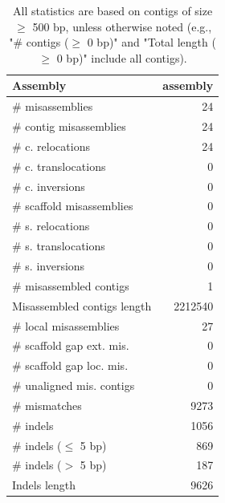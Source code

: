 \documentclass[12pt,a4paper]{article}
\begin{document}
\begin{table}[ht]
\begin{center}
\caption{All statistics are based on contigs of size $\geq$ 500 bp, unless otherwise noted (e.g., "\# contigs ($\geq$ 0 bp)" and "Total length ($\geq$ 0 bp)" include all contigs).}
\begin{tabular}{|l*{1}{|r}|}
\hline
Assembly & assembly \\ \hline
\# misassemblies & 24 \\ \hline
\hspace{2mm}\# contig misassemblies & 24 \\ \hline
\hspace{5mm}\# c. relocations & 24 \\ \hline
\hspace{5mm}\# c. translocations & 0 \\ \hline
\hspace{5mm}\# c. inversions & 0 \\ \hline
\hspace{2mm}\# scaffold misassemblies & 0 \\ \hline
\hspace{5mm}\# s. relocations & 0 \\ \hline
\hspace{5mm}\# s. translocations & 0 \\ \hline
\hspace{5mm}\# s. inversions & 0 \\ \hline
\# misassembled contigs & 1 \\ \hline
Misassembled contigs length & 2212540 \\ \hline
\# local misassemblies & 27 \\ \hline
\# scaffold gap ext. mis. & 0 \\ \hline
\# scaffold gap loc. mis. & 0 \\ \hline
\# unaligned mis. contigs & 0 \\ \hline
\# mismatches & 9273 \\ \hline
\# indels & 1056 \\ \hline
\hspace{5mm}\# indels ($\leq$ 5 bp) & 869 \\ \hline
\hspace{5mm}\# indels ($>$ 5 bp) & 187 \\ \hline
Indels length & 9626 \\ \hline
\end{tabular}
\end{center}
\end{table}
\end{document}
